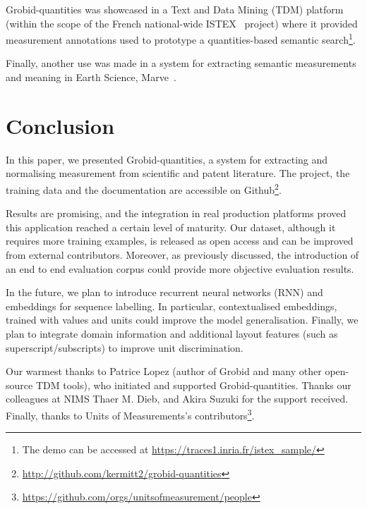 \documentclass[sigconf]{acmart}
\begin{document}
Grobid-quantities was showcased in a Text and Data Mining (TDM) platform (within the scope of the French national-wide ISTEX~\cite{dazy2014istex} project) where it provided measurement annotations used to prototype a quantities-based semantic search\footnote{The demo can be accessed at \url{https://traces1.inria.fr/istex_sample/}}. 

Finally, another use was made in a system for extracting semantic measurements and meaning in Earth Science, Marve~\cite{hundman2017measurement}.  

\section{Conclusion}
\label{sec:conclusion}
In this paper, we presented Grobid-quantities, a system for extracting and normalising measurement from scientific and patent literature.
The project, the training data and the documentation are accessible on Github\footnote{\url{http://github.com/kermitt2/grobid-quantities}}. 

Results are promising, and the integration in real production platforms proved this application reached a certain level of maturity. Our dataset, although it requires more training examples, is released as open access and can be improved from external contributors. Moreover, as previously discussed, the introduction of an end to end evaluation corpus could provide more objective evaluation results. 

In the future, we plan to introduce recurrent neural networks (RNN) and embeddings for sequence labelling. In particular, contextualised embeddings, trained with values and units could improve the model generalisation. Finally, we plan to integrate domain information and additional layout features (such as superscript/subscripts) to improve unit discrimination. 
 

\begin{acks}
Our warmest thanks to Patrice Lopez (author of Grobid and many other open-source TDM tools), who initiated and supported Grobid-quantities. Thanks our colleagues at NIMS Thaer M. Dieb, and Akira Suzuki for the support received. Finally, thanks to Units of Measurements's contributors\footnote{\url{https://github.com/orgs/unitsofmeasurement/people}}.
\end{acks}




\end{document}
